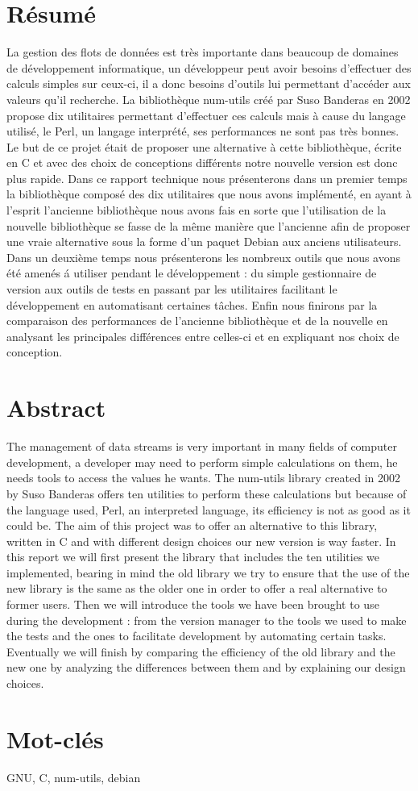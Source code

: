 \section*{R\'esum\'e}

La gestion des flots de donn\'ees est tr\`es importante dans beaucoup de domaines de d\'eveloppement informatique, un d\'eveloppeur peut avoir besoins d'effectuer des calculs simples sur ceux-ci, il a donc besoins d'outils lui permettant d'acc\'eder aux valeurs qu'il recherche. La biblioth\`eque num-utils cr\'e\'e par Suso Banderas en 2002 propose dix utilitaires permettant d'effectuer ces calculs mais \`a cause du langage utilis\'e, le Perl, un langage interpr\'et\'e, ses performances ne sont pas tr\`es bonnes. Le but de ce projet \'etait de proposer une alternative \`a cette biblioth\`eque, \'ecrite en C et avec des choix de conceptions diff\'erents notre nouvelle version est donc plus rapide. Dans ce rapport technique nous pr\'esenterons dans un premier temps la biblioth\`eque compos\'e des dix utilitaires que nous avons impl\'ement\'e, en ayant \`a l'esprit l'ancienne biblioth\`eque nous avons fais en sorte que l'utilisation de la nouvelle biblioth\`eque se fasse de la m\^eme mani\`ere que l'ancienne afin de proposer une vraie alternative sous la forme d'un paquet Debian aux anciens utilisateurs. Dans un deuxi\`eme temps nous pr\'esenterons les nombreux outils que nous avons \'et\'e amen\'es \'a utiliser pendant le d\'eveloppement : du simple gestionnaire de version aux outils de tests en passant par les utilitaires facilitant le d\'eveloppement en automatisant certaines t\^aches. Enfin nous finirons par la comparaison des performances de l'ancienne biblioth\`eque et de la nouvelle en analysant les principales diff\'erences entre celles-ci et en expliquant nos choix de conception.

\section*{Abstract}

The management of data streams is very important in many fields of computer development, a developer may need to perform simple calculations on them, he needs tools to access the values he wants. The num-utils library created in 2002 by Suso Banderas offers ten utilities to perform these calculations but because of the language used, Perl, an interpreted language, its efficiency is not as good as it could be. The aim of this project was to offer an alternative to this library, written in C and with different design choices our new version is way faster. In this report we will first present  the library that includes the ten utilities we implemented, bearing in mind the old library we try to ensure that the use of the new library is the same as the older one in order to offer a real alternative to former users. Then we will introduce the tools we have been brought to use during the development : from the version manager to the tools we used to make the tests and the ones to facilitate development by automating certain tasks. Eventually we will finish by comparing the efficiency of the old library and the new one by analyzing the differences between them and by explaining our design choices.

\section*{Mot-cl\'es}

GNU, C, num-utils, debian
